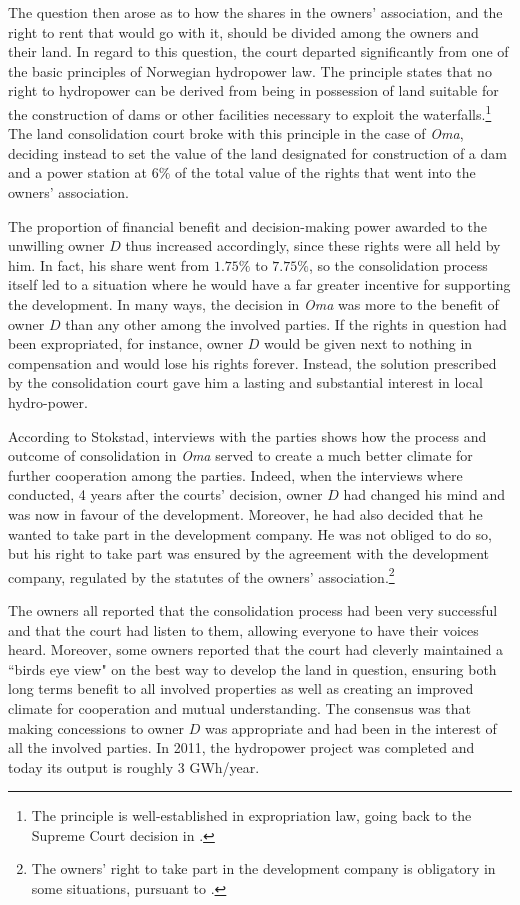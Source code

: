 The question then arose as to how the shares in the owners' association, and the right to rent that would go with it, should be divided among the owners and their land. In regard to this question, the court departed significantly from one of the basic principles of Norwegian hydropower law. The principle states that no right to hydropower can be derived from being in possession of land suitable for the construction of dams or other facilities necessary to exploit the waterfalls.\footnote{The principle is well-established in expropriation law, going back to the Supreme Court decision in \cite{herlandsfossen22}.} The land consolidation court broke with this principle in the case of \emph{Oma}, deciding instead to set the value of the land designated for construction of a dam and a power station at $6 \%$ of the total value of the rights that went into the owners' association. 

The proportion of financial benefit and decision-making power awarded to the unwilling owner $D$ thus increased accordingly, since these rights were all held by him. In fact, his share went from $1.75 \%$ to $7.75 \%$, so the consolidation process itself led to a situation where he would have a far greater incentive for supporting the development. In many ways, the decision in \emph{Oma} was more to the benefit of owner $D$ than any other among the involved parties. If the rights in question had been expropriated, for instance, owner $D$ would be given next to nothing in compensation and would lose his rights forever. Instead, the solution prescribed by the consolidation court gave him a lasting and substantial interest in local hydro-power.

According to Stokstad, interviews with the parties shows how the process and outcome of consolidation in \emph{Oma} served to create a much better climate for further cooperation among the parties. Indeed, when the interviews where conducted, 4 years after the courts' decision, owner $D$ had changed his mind and was now in favour of the development. Moreover, he had also decided that he wanted to take part in the development company. He was not obliged to do so, but his right to take part was ensured by the agreement with the development company, regulated by the statutes of the owners' association.\footnote{The owners' right to take part in the development company is obligatory in some situations, pursuant to \cite[34 b) no 3]{lca79}.}

The owners all reported that the consolidation process had been very successful and that the court had listen to them, allowing everyone to have their voices heard. Moreover, some owners reported that the court had cleverly maintained a ``birds eye view" on the best way to develop the land in question, ensuring both long terms benefit to all involved properties as well as creating an improved climate for cooperation and mutual understanding. The consensus was that making concessions to owner $D$ was appropriate and had been in the interest of all the involved parties. In 2011, the hydropower project was completed and today its output is roughly 3 GWh/year.

